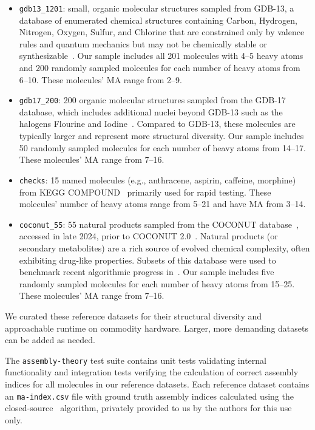 \documentclass[acmsmall,nonacm,screen]{acmart}  %
\begin{document}
\begin{itemize}
    \item \texttt{gdb13\_1201}:  small, organic molecular structures sampled from GDB-13, a database of enumerated chemical structures containing Carbon, Hydrogen, Nitrogen, Oxygen, Sulfur, and Chlorine that are constrained only by valence rules and quantum mechanics but may not be chemically stable or synthesizable~\cite{Blum2009-970million}.
    Our sample includes all 201 molecules with 4--5 heavy atoms and 200 randomly sampled molecules for each number of heavy atoms from 6--10.
    These molecules' MA range from 2--9.

    \item \texttt{gdb17\_200}: 200 organic molecular structures sampled from the GDB-17 database, which includes additional nuclei beyond GDB-13 such as the halogens Flourine and Iodine~\cite{Ruddigkeit2012-enumeration166}.
    Compared to GDB-13, these molecules are typically larger and represent more structural diversity.
    Our sample includes 50 randomly sampled molecules for each number of heavy atoms from 14--17.
    These molecules' MA range from 7--16.

    \item \texttt{checks}: 15 named molecules (e.g., anthracene, aspirin, caffeine, morphine) from KEGG COMPOUND~\cite{Kanehisa2000-keggkyoto,Kanehisa2019-understandingorigin,Kanehisa2023-keggtaxonomybased} primarily used for rapid testing.
    These molecules' number of heavy atoms range from 5--21 and have MA from 3--14.

    \item \texttt{coconut\_55}: 55 natural products sampled from the COCONUT database~\cite{Sorokina2021-coconutonline}, accessed in late 2024, prior to COCONUT 2.0~\cite{Chandrasekhar2025-coconut20}.
    Natural products (or secondary metabolites) are a rich source of evolved chemical complexity, often exhibiting drug-like properties.
    Subsets of this database were used to benchmark recent algorithmic progress in~\cite{Seet2024-rapidcomputation}.
    Our sample includes five randomly sampled molecules for each number of heavy atoms from 15--25.
    These molecules' MA range from 7--16.
\end{itemize}

We curated these reference datasets for their structural diversity and approachable runtime on commodity hardware.
Larger, more demanding datasets can be added as needed.

The \texttt{assembly-theory} test suite contains unit tests validating internal functionality and integration tests verifying the calculation of correct assembly indices for all molecules in our reference datasets.
Each reference dataset contains an \texttt{ma-index.csv} file with ground truth assembly indices calculated using the closed-source~\cite{Seet2024-rapidcomputation} algorithm, privately provided to us by the authors for this use only.
\end{document}
